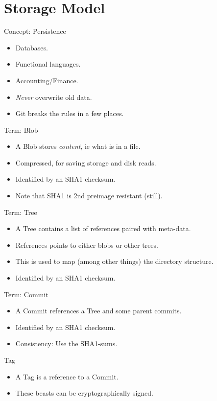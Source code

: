 \documentclass[xcolor=pdftex,dvipsnames]{beamer}
\begin{document}
\section{Storage Model}
\begin{frame}{Concept: Persistence}
  \begin{itemize}
  \item Databases.
  \item Functional languages.
  \item Accounting/Finance.
  \item \emph{Never} overwrite old data.
  \item Git breaks the rules in a few places.
  \end{itemize}
\end{frame}
\begin{frame}{Term: Blob}
  \begin{itemize}
  \item A Blob stores \emph{content}, ie what is in a file.
  \item Compressed, for saving storage and disk reads.
  \item Identified by an SHA1 checksum.
  \item Note that SHA1 is 2nd preimage resistant (still).
  \end{itemize}
\end{frame}
\begin{frame}{Term: Tree}
  \begin{itemize}
  \item A Tree contains a list of references paired with meta-data.
  \item References points to either blobs or other trees.
  \item This is used to map (among other things) the directory
    structure.
  \item Identified by an SHA1 checksum.
  \end{itemize}
\end{frame}
\begin{frame}{Term: Commit}
  \begin{itemize}
  \item A Commit references a Tree and some parent commits.
  \item Identified by an SHA1 checksum.
  \item Consistency: Use the SHA1-sums.
  \end{itemize}
\end{frame}
\begin{frame}{Tag}
  \begin{itemize}
  \item A Tag is a reference to a Commit.
  \item These beasts can be cryptographically signed.
  \end{itemize}
\end{frame}
\end{document}
